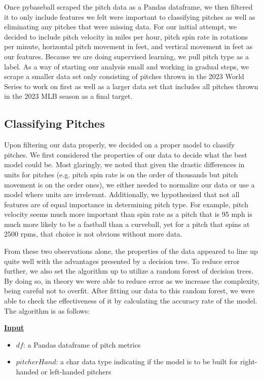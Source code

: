 \documentclass{article}
\begin{document}
Once pybaseball scraped the pitch data as a Pandas dataframe, we 
then filtered it to only include features we felt were important to 
classifying pitches as well as eliminating any pitches that were missing 
data. For our initial attempt, we decided to include pitch velocity in miles per 
hour, pitch spin rate in rotations per minute, horizontal pitch movement in feet, and 
vertical movement in feet as our features. Because we are doing supervised learning, we 
pull pitch type as a label. As a way of starting our analysis small 
and working in gradual steps, we scrape a smaller data set only consisting of pitches thrown 
in the 2023 World Series to work on first as well as a larger data set that includes all pitches 
thrown in the 2023 MLB season as a final target. 

\subsection{Classifying Pitches}
\label{classify}

Upon filtering our data properly, we decided on a proper model to classify pitches. We 
first considered the properties of our data to decide what the best model could be. Most 
glaringly, we noted that given the drastic differences in units for pitches (e.g. 
pitch spin rate is on the order of thousands but pitch movement is on the order ones), 
we either needed to normalize our data or use a model where units are irrelevant. 
Additionally, we hypothesized that not all features are of equal importance in 
determining pitch type. For example, pitch velocity seems much more important than 
spin rate as a pitch that is 95 mph is much more likely to be a fastball than a curveball, 
yet for a pitch that spins at 2500 rpms, that choice is not obvious without more data. 

From these two observations alone, the properties of the data appeared to line up 
quite well with the advantages presented by a decision tree. To reduce error further, 
we also set the algorithm up to utilize a random forest of decision trees. By doing 
so, in theory we were able to reduce error as we increase the complexity, being careful 
not to overfit. After fitting our data to this random forest, we were able to check 
the effectiveness of it by calculating the accuracy rate of the model. The algorithm 
is as follows:

\textbf{\underline{Input}}
\begin{itemize}[noitemsep]
  \item $df$: a Pandas dataframe of pitch metrics

  \item $pitcherHand$: a char data type indicating if the model is to be built for right-handed 
  or left-handed pitchers
\end{itemize}
\end{document}
